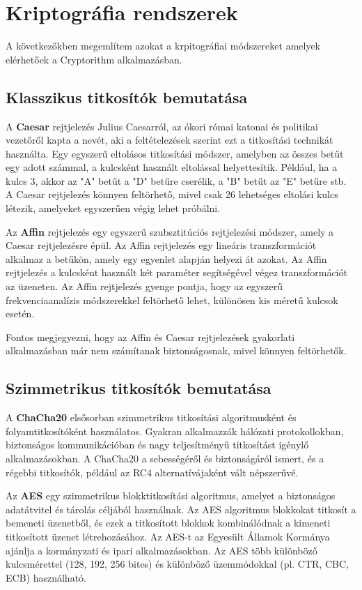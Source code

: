 \section{Kriptográfia rendszerek}
A következőkben megemlítem azokat a krpitográfiai módszereket amelyek elérhetőek a Cryptorithm alkalmazásban.


\subsection{Klasszikus titkosítók bemutatása}
A \textbf{Caesar} rejtjelezés Julius Caesarról, az ókori római katonai és politikai vezetőről kapta a nevét, aki a feltételezések szerint ezt a titkosítási technikát használta. Egy egyszerű eltolásos titkosítási módszer, amelyben az összes betűt egy adott számmal, a kulcsként használt eltolással helyettesítik. Például, ha a kulcs 3, akkor az "A" betűt a "D" betűre cserélik, a "B" betűt az "E" betűre stb. A Caesar rejtjelezés könnyen feltörhető, mivel csak 26 lehetséges eltolási kulcs létezik, amelyeket egyszerűen végig lehet próbálni.


Az \textbf{Affin} rejtjelezés egy egyszerű szubsztitúciós rejtjelezési módszer, amely a Caesar rejtjelezésre épül. Az Affin rejtjelezés egy lineáris transzformációt alkalmaz a betűkön, amely egy egyenlet alapján helyezi át azokat. Az Affin rejtjelezés a kulcsként használt két paraméter segítségével végez transzformációt az üzeneten. Az Affin rejtjelezés gyenge pontja, hogy az egyszerű frekvenciaanalízis módszerekkel feltörhető lehet, különösen kis méretű kulcsok esetén.


Fontos megjegyezni, hogy az Affin és Caesar rejtjelezések gyakorlati alkalmazásban már nem számítanak biztonságosnak, mivel könnyen feltörhetők.

\pagebreak
\subsection {Szimmetrikus titkosítók bemutatása}
A \textbf{ChaCha20} elsősorban szimmetrikus titkosítási algoritmusként és folyamtitkosítóként használatos. Gyakran alkalmazzák hálózati protokollokban, biztonságos kommunikációban és nagy teljesítményű titkosítást igénylő alkalmazásokban. A ChaCha20 a sebességéről és biztonságáról ismert, és a régebbi titkosítók, például az RC4 alternatívájaként vált népszerűvé. \cite{Heiko}


Az \textbf{AES} egy szimmetrikus blokktitkosítási algoritmus, amelyet a biztonságos adatátvitel és tárolás céljából használnak. Az AES algoritmus blokkokat titkosít a bemeneti üzenetből, és ezek a titkosított blokkok kombinálódnak a kimeneti titkosított üzenet létrehozásához. Az AES-t az Egyesült Államok Kormánya ajánlja a kormányzati és ipari alkalmazásokban. Az AES több különböző kulcsmérettel (128, 192, 256 bites) és különböző üzemmódokkal (pl. CTR, CBC, ECB) használható. \cite{AES}


